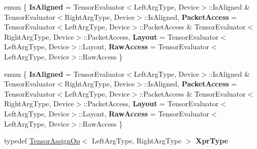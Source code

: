 \begin{DoxyCompactItemize}
\item 
\mbox{\label{struct_eigen_1_1_tensor_evaluator_3_01const_01_tensor_assign_op_3_01_left_arg_type_00_01_right_arg_type_01_4_00_01_device_01_4_aeca1487153825caccfc9ecaf7b0d6ddb}} 
enum \{ {\bfseries Is\+Aligned} = Tensor\+Evaluator$<$Left\+Arg\+Type, Device$>$\+:\+:Is\+Aligned \& Tensor\+Evaluator$<$Right\+Arg\+Type, Device$>$\+:\+:Is\+Aligned, 
{\bfseries Packet\+Access} = Tensor\+Evaluator$<$Left\+Arg\+Type, Device$>$\+:\+:Packet\+Access \& Tensor\+Evaluator$<$Right\+Arg\+Type, Device$>$\+:\+:Packet\+Access, 
{\bfseries Layout} = Tensor\+Evaluator$<$Left\+Arg\+Type, Device$>$\+:\+:Layout, 
{\bfseries Raw\+Access} = Tensor\+Evaluator$<$Left\+Arg\+Type, Device$>$\+:\+:Raw\+Access
 \}
\item 
\mbox{\label{struct_eigen_1_1_tensor_evaluator_3_01const_01_tensor_assign_op_3_01_left_arg_type_00_01_right_arg_type_01_4_00_01_device_01_4_a35f3ffcbe2b1c10a88c63dba0de2c2aa}} 
enum \{ {\bfseries Is\+Aligned} = Tensor\+Evaluator$<$Left\+Arg\+Type, Device$>$\+:\+:Is\+Aligned \& Tensor\+Evaluator$<$Right\+Arg\+Type, Device$>$\+:\+:Is\+Aligned, 
{\bfseries Packet\+Access} = Tensor\+Evaluator$<$Left\+Arg\+Type, Device$>$\+:\+:Packet\+Access \& Tensor\+Evaluator$<$Right\+Arg\+Type, Device$>$\+:\+:Packet\+Access, 
{\bfseries Layout} = Tensor\+Evaluator$<$Left\+Arg\+Type, Device$>$\+:\+:Layout, 
{\bfseries Raw\+Access} = Tensor\+Evaluator$<$Left\+Arg\+Type, Device$>$\+:\+:Raw\+Access
 \}
\item 
\mbox{\label{struct_eigen_1_1_tensor_evaluator_3_01const_01_tensor_assign_op_3_01_left_arg_type_00_01_right_arg_type_01_4_00_01_device_01_4_a2707127068f70d0ca9760e36dad5afa3}} 
typedef \hyperlink{class_eigen_1_1_tensor_assign_op}{Tensor\+Assign\+Op}$<$ Left\+Arg\+Type, Right\+Arg\+Type $>$ {\bfseries Xpr\+Type}
\item 
\mbox{\label{struct_eigen_1_1_tensor_evaluator_3_01const_01_tensor_assign_op_3_01_left_arg_type_00_01_right_arg_type_01_4_00_01_device_01_4_afc95d3761518c512fd75aa1129963bc4}} 

\end{DoxyCompactItemize}
